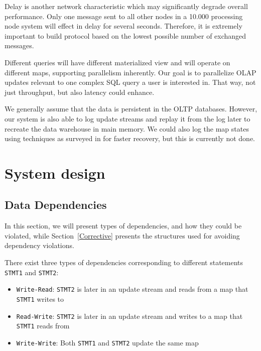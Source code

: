 \documentclass{sig-semester}
\def\SQL{SQL\xspace}
\def\OLAP{OLAP\xspace}
\def\OLTP{OLTP\xspace}
\begin{document}
Delay is another network characteristic which may significantly degrade overall performance. Only one message sent to all other nodes in a 10.000 processing node system will effect in delay for several seconds. Therefore, it is extremely important to build protocol based on the lowest possible number of exchanged messages.
 
Different queries will have different materialized view and will operate on different maps, supporting parallelism inherently. Our goal is to parallelize \OLAP updates relevant to one complex \SQL query a user is interested in. That way, not just throughput, but also latency could enhance.

We generally assume that the data is persistent in the \OLTP databases.
However, our system is also able to
log update streams and replay it from the
log later to recreate the data warehouse in main memory.
We could also log the map states using techniques as surveyed in
\cite{DBLP:journals/pvldb/SallesCSDGKW09}
for faster recovery, but this is currently not done.

\section{System design}
\label{sec:sysdesign}
\vspace{2mm}

\subsection{Data Dependencies}
In this section, we will present types of dependencies, and how they could be violated, while Section~\ref{Corrective} presents the structures used for avoiding dependency violations.

There exist three types of dependencies corresponding to different statements \texttt{STMT1} and \texttt{STMT2}:
\begin{itemize}
 \item \texttt{Write-Read}: \texttt{STMT2} is later in an update stream and reads from a map that \texttt{STMT1} writes to
 \item \texttt{Read-Write}: \texttt{STMT2} is later in an update stream and writes to a map that \texttt{STMT1} reads from
 \item \texttt{Write-Write}: Both \texttt{STMT1} and \texttt{STMT2} update the same map
\end{itemize}
\end{document}
